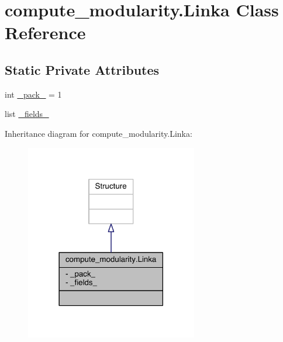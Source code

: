 \hypertarget{classcompute__modularity_1_1_linka}{\section{compute\+\_\+modularity.\+Linka Class Reference}
\label{classcompute__modularity_1_1_linka}
}
\subsection*{Static Private Attributes}
\begin{DoxyCompactItemize}
\item 
int \hyperlink{classcompute__modularity_1_1_linka_aeb6070c463e17d64bbaa4af685a81dad}{\+\_\+pack\+\_\+} = 1
\item 
list \hyperlink{classcompute__modularity_1_1_linka_a3c513154a41c038ac774542380419f38}{\+\_\+fields\+\_\+}
\end{DoxyCompactItemize}


Inheritance diagram for compute\+\_\+modularity.\+Linka\+:\nopagebreak
\begin{figure}[H]
\begin{center}
\leavevmode
\includegraphics[width=213pt]{classcompute__modularity_1_1_linka__inherit__graph}
\end{center}
\end{figure}


